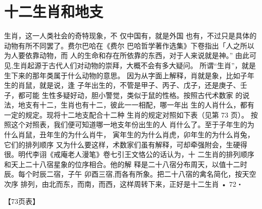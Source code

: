 \section{十二生肖和地支}

生肖，这一人类社会的奇特现象，不 仅中国有，就是外国
也有，不过只是具体的动物有所不同罢了。费尔巴哈在《费尔
巴哈哲学著作选集》下卷指出「人之所以为人要依靠动物，而
人的生命和存在所依靠的东西，对于人来说就是神。” 由此可
见,生肖起源于古代人们对动物的崇拜，大概不会有多大疑问。
所谓“生肖”，就是生下来的那年类属于什么动物的意思。
因为从字面上解释，肖就是象，比如子年生的肖鼠，就是说，逢
子年出生的，不管是甲子、丙子、戊子，还是庚子、壬子，都可能
生性多疑好动，胆小警觉，类似于鼠的性格。按照古代术数家
的说法，地支有十二，生肖也有十二，彼此一一相配，哪一年出
生的人肖什么，都有一定的规定。现将十二地支配合十二种
生肖的规定对照如下表（见第 73 页）。
按照这个对照表，我们便可知道哪一地支年份出生的人
肖什么了。至于子年生的为什么肖鼠，丑年生的为什么肖牛，
寅年生的为什么肖虎，卯年生的为什么肖兔，它们的排列顺序
又为什么要这样，术数家们虽有解释，可却牵强附会，生硬得
很。明代李诩《戒庵老人漫笔》卷七引王文恪公的话认为，十
二生肖的排列顺序和天上二十八宿星象的位序相合。他的解
释是二十八宿分布周天，以值十二时辰。每个时辰二宿，子午
卯酉三宿,而各有所象。把二十八宿的禽名简化，按天空次序
排列，由北而东，而南，而西，这样周转下来，正好是十二生肖
• 72・

【73页表】


